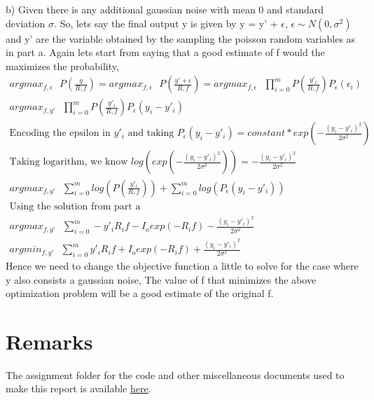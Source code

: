 \documentclass[11pt]{article}
\begin{document}
\begin{enumerate}
b) Given there is any additional gaussian noise with mean 0 and standard deviation $\sigma$. So, lets say the final output y is given by  y = y' + $\epsilon$,  $\epsilon \sim N(0, \sigma^2)$ and y' are the variable obtained by the sampling the poisson random variables as in part a. Again lets start from saying that a good estimate of f would the maximizes the probability, 
\begin{gather*}
    argmax_{f, \epsilon}\text{ } {P\left(\frac{y}{R, f}\right)} = argmax_{f, \epsilon}\text{ } {P\left(\frac{y'+\epsilon}{R, f}\right)} =  argmax_{f, \epsilon}\text{ } \prod_{i=0}^m P\left(\frac{y'_i}{R, f}\right)P_{\epsilon}(\epsilon_i)\\
    argmax_{f, y'}\text{ } \prod_{i=0}^m P\left(\frac{y'_i}{R, f}\right)P_{\epsilon}(y_i - y'_i)\\
    \text{Encoding the epsilon in $y'_i$ and taking } P_{\epsilon}(y_i - y'_i) = constant * exp(-\frac{(y_i - y'_i)^2}{2\sigma^2})\\
    \text{Taking logarithm, we know } log(exp(-\frac{(y_i - y'_i)^2}{2\sigma^2})) = -\frac{(y_i - y'_i)^2}{2\sigma^2}\\
    argmax_{f, y'}\text{ } \sum_{i=0}^m log(P\left(\frac{y'_i}{R, f}\right)) + \sum_{i=0}^m log( P_{\epsilon}(y_i - y'_i))\\
    \text{Using the solution from part a}\\
    argmax_{f, y'} \text{ } \sum_{i=0}^m -y'_iR_if - I_o exp(-R_if) -\frac{(y_i - y'_i)^2}{2\sigma^2}\\
    argmin_{f,y'} \text{ } \sum_{i=0}^m y'_iR_if + I_o exp(-R_if) +\frac{(y_i - y'_i)^2}{2\sigma^2}
\end{gather*}
Hence we need to change the objective function a little to solve for the case where y also consists a gaussian noise, The value of f that minimizes the above optimization problem will be a good estimate of the original f.


\end{enumerate}

\section*{Remarks}
The assignment folder for the code and other miscellaneous documents used to make this report is available \href{https://github.com/SKARA2000/CS754_HW4}{here}.
\end{document}
